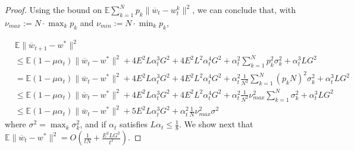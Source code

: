 \begin{proof}
\begin{comment}
	& \leq2\sigma^{2}+4\sum_{k}p_{k}\left(L^{2}\|\overline{w}_{t-1}-w_{t-1}^{k}\|^{2}+\|\nabla F_{k}(\overline{w}_{t-1})\|^{2}\right)
	\end{align*}
	so that 
	\begin{align*}
	\sum_{k=1}^{N}p_{k}\|\overline{w}_{t}-w_{t}^{k}\|^{2} & \leq2(1+4L^{2}\alpha_{t-1}^{2})\sum_{k=1}^{N}p_{k}\|\overline{w}_{t-1}-w_{t-1}^{k}\|^{2}+4\sigma^{2}\alpha_{t-1}^{2}+8\alpha_{t-1}^{2}\sum_{k}p_{k}\|\nabla F_{k}(\overline{w}_{t-1})\|^{2}
	\end{align*}
	and taking expectation, we have 
	\begin{align*}
	\mathbb{E}\sum_{k=1}^{N}p_{k}\|\overline{w}_{t}-w_{t}^{k}\|^{2} & \leq2(1+4L^{2}\alpha_{t-1}^{2})\mathbb{E}\sum_{k=1}^{N}p_{k}\|\overline{w}_{t-1}-w_{t-1}^{k}\|^{2}+4\alpha_{t-1}^{2}(\sigma^{2}+2G^{2})
	\end{align*}
	Using this recusive relation at most $E$ times to arrive at a communication
	round and that $\alpha_{t}L\leq1/8$ for all $t$, we have 
	\begin{align*}
	\mathbb{E}\sum_{k=1}^{N}p_{k}\|\overline{w}_{t}-w_{t}^{k}\|^{2}\leq E\frac{1}{L^{2}}(\sigma^{2}+2G^{2})
	\end{align*}
	which gives 
	\end{comment}
	{} 
	
	Using the bound on $\mathbb{E}\sum_{k=1}^{N}p_{k}\|\overline{w}_{t}-w_{t}^{k}\|^{2}$,
	we can conclude that, with $\nu_{max}:=N\cdot\max_{k}p_{k}$ and $\nu_{min}:=N\cdot\min_{k}p_{k}$, 
	
	\begin{align*}
	& \mathbb{E}\|\overline{w}_{t+1}-w^{\ast}\|^{2}\\
	& \leq\mathbb{E}(1-\mu\alpha_{t})\|\overline{w}_{t}-w^{\ast}\|^{2}+4E^{2}L\alpha_{t}^{3}G^{2}+4E^{2}L^{2}\alpha_{t}^{4}G^{2}+\alpha_{t}^{2}\sum_{k=1}^{N}p_{k}^{2}\sigma_{k}^{2}+\alpha_{t}^{3}LG^{2}\\
	& =\mathbb{E}(1-\mu\alpha_{t})\|\overline{w}_{t}-w^{\ast}\|^{2}+4E^{2}L\alpha_{t}^{3}G^{2}+4E^{2}L^{2}\alpha_{t}^{4}G^{2}+\alpha_{t}^{2}\frac{1}{N^{2}}\sum_{k=1}^{N}(p_{k}N)^{2}\sigma_{k}^{2}+\alpha_{t}^{3}LG^{2}\\
	& \leq\mathbb{E}(1-\mu\alpha_{t})\|\overline{w}_{t}-w^{\ast}\|^{2}+4E^{2}L\alpha_{t}^{3}G^{2}+4E^{2}L^{2}\alpha_{t}^{4}G^{2}+\alpha_{t}^{2}\frac{1}{N^{2}}\nu_{max}^{2}\sum_{k=1}^{N}\sigma_{k}^{2}+\alpha_{t}^{3}LG^{2}\\
	& \leq\mathbb{E}(1-\mu\alpha_{t})\|\overline{w}_{t}-w^{\ast}\|^{2}+5E^{2}L\alpha_{t}^{3}G^{2}+\alpha_{t}^{2}\frac{1}{N}\nu_{max}^{2}\sigma^{2}
	\end{align*}
	where $\sigma^{2}=\max_{k}\sigma_{k}^{2}$, and if $\alpha_{t}$
	satisfies $L\alpha_{t}\leq\frac{1}{8}$. We show next that $\mathbb{E}\|\overline{w}_{t}-w^{\ast}\|^{2}=O(\frac{1}{tN}+\frac{E^{2}LG^{2}}{t^{2}})$. 
	

\end{proof}
